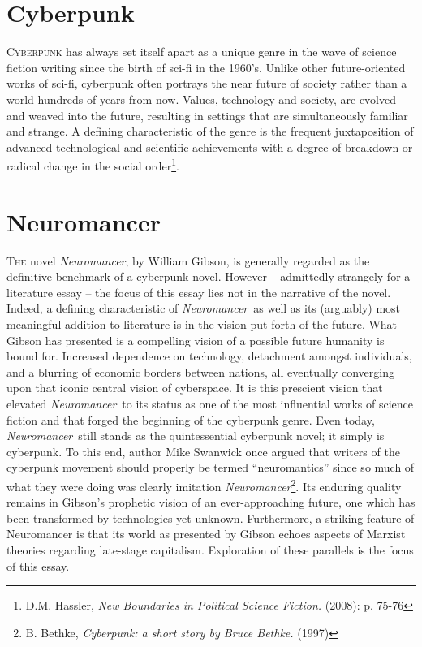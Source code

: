 \documentclass[11pt]{article}
\newcommand\neuro{\textit{Neuromancer}}
\newcommand\addtotocsection[1]{\addcontentsline{toc}{section}{#1}}
\newcommand\hasslerref{D.M. Hassler, \textit{ New Boundaries in Political Science Fiction.} (2008)}
\newcommand\bethkeref{B. Bethke, \textit{Cyberpunk: a short story by Bruce Bethke.} (1997)}
\begin{document}
	\tableofcontents
	
	\newpage
	
	\section*{Cyberpunk}\addtotocsection{Cyberpunk}
	\textsc{Cyberpunk} has always set itself apart as a unique genre in the wave of science fiction writing since the birth of sci-fi in the 1960’s. Unlike other future-oriented works of sci-fi, cyberpunk often portrays the near future of society rather than a world hundreds of years from now. Values, technology and society, are evolved and weaved into the future, resulting in settings that are simultaneously familiar and strange. A defining characteristic of the genre is the frequent juxtaposition of advanced technological and scientific achievements with a degree of breakdown or radical change in the social order\footnote{\hasslerref: p. 75-76}.
	
	\section*{Neuromancer}\addtotocsection{Neuromancer}
	\textsc{The} novel \neuro, by William Gibson, is generally regarded as the definitive benchmark of a cyberpunk novel. However – admittedly strangely for a literature essay – the focus of this essay lies not in the narrative of the novel. Indeed, a defining characteristic of \neuro\ as well as its (arguably) most meaningful addition to literature is in the vision put forth of the future. What Gibson has presented is a compelling vision of a possible future humanity is bound for. Increased dependence on technology, detachment amongst individuals, and a blurring of economic borders between nations, all eventually converging upon that iconic central vision of cyberspace. It is this prescient vision that elevated \neuro\ to its status as one of the most influential works of science fiction and that forged the beginning of the cyberpunk genre. Even today, \neuro\ still stands as the quintessential cyberpunk novel; it simply is cyberpunk. To this end, author Mike Swanwick once argued that writers of the cyberpunk movement should properly be termed ``neuromantics'' since so much of what they were doing was clearly imitation \neuro\footnote{\bethkeref}. Its enduring quality remains in Gibson’s prophetic vision of an ever-approaching future, one which has been transformed by technologies yet unknown. Furthermore, a striking feature of Neuromancer is that its world as presented by Gibson echoes aspects of Marxist theories regarding late-stage capitalism. Exploration of these parallels is the focus of this essay.
	
\end{document}

